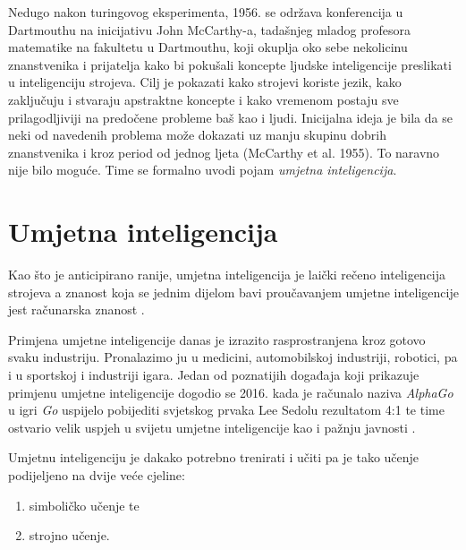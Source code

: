 \documentclass[times, utf8, zavrsni]{fer}
\begin{document}
Nedugo nakon turingovog eksperimenta, 1956. se održava konferencija u Dartmouthu \citep{wiki:DART} na inicijativu John McCarthy-a, tadašnjeg mladog profesora matematike na fakultetu u Dartmouthu, koji okuplja oko sebe nekolicinu znanstvenika i prijatelja kako bi pokušali koncepte ljudske inteligencije preslikati u inteligenciju strojeva. Cilj je pokazati kako strojevi koriste jezik, kako zaključuju i stvaraju apstraktne koncepte i kako vremenom postaju sve prilagodljiviji na predočene probleme baš kao i ljudi. Inicijalna ideja je bila da se neki od navedenih problema može dokazati uz manju skupinu dobrih znanstvenika i kroz period od jednog ljeta (McCarthy et al. 1955). To naravno nije bilo moguće. Time se formalno uvodi pojam \textit{umjetna inteligencija}.

\section{Umjetna inteligencija}
Kao što je anticipirano ranije, umjetna inteligencija  je laički rečeno inteligencija strojeva a znanost koja se jednim dijelom bavi proučavanjem umjetne inteligencije jest računarska znanost .

Primjena umjetne inteligencije danas je izrazito rasprostranjena kroz gotovo svaku industriju. Pronalazimo ju u medicini, automobilskoj industriji, robotici, pa i u sportskoj i industriji igara. Jedan od poznatijih događaja koji prikazuje primjenu umjetne inteligencije dogodio se 2016. kada je računalo naziva \textit{AlphaGo} u igri \textit{Go} uspijelo pobijediti svjetskog prvaka Lee Sedolu rezultatom 4:1 te time ostvario velik uspjeh u svijetu umjetne inteligencije kao i pažnju javnosti \citep{moyerGO}.

Umjetnu inteligenciju je dakako potrebno trenirati i učiti pa je tako učenje podijeljeno na dvije veće cjeline:
\begin{center}
    \begin{enumerate}
        \item simboličko učenje te
        \item strojno učenje.
    \end{enumerate}
\end{center}
\end{document}
